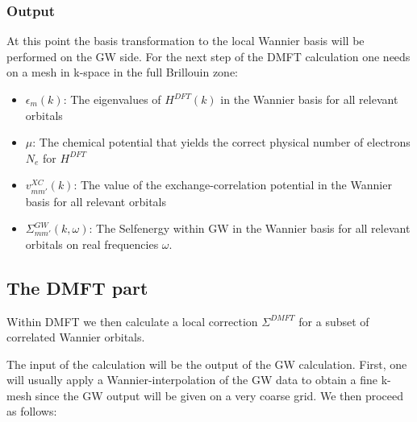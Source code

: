 \documentclass[12pt,a4paper]{scrartcl}
\numberwithin{equation}{subsection}
\begin{document}
\subsubsection{Output}
At this point the basis transformation to the local Wannier basis will be
performed on the GW side.
For the next step of the DMFT calculation one needs
on a mesh in k-space in the full Brillouin zone:
\begin{itemize}
\item $\epsilon_m(k)$: The eigenvalues  of $H^{DFT}(k)$ in the Wannier basis
for all relevant orbitals
\item $\mu$: The chemical potential that yields the correct physical number of electrons $N_e$
for $H^{DFT}$
\item $v^{XC}_{mm'}(k)$: The value of the exchange-correlation potential 
in the Wannier basis for all relevant orbitals
\item $\Sigma^{GW}_{mm'}(k,\omega)$: The Selfenergy within GW in the Wannier basis for all relevant orbitals
on real frequencies $\omega$.
\end{itemize}


\subsection{The DMFT part}

Within DMFT we then calculate a local correction $\Sigma^{DMFT}$ for a subset of correlated
Wannier orbitals.

The input of the calculation will be the output of the GW calculation. First, one will usually apply a Wannier-interpolation of the GW data to obtain a fine k-mesh
since the GW output will be given on a very coarse grid.
We then proceed as follows:
\end{document}
